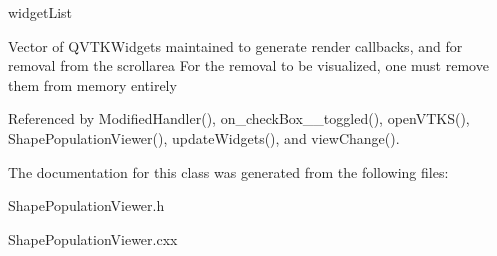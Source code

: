 widget\-List 

Vector of Q\-V\-T\-K\-Widgets maintained to generate render callbacks, and for removal from the scrollarea For the removal to be visualized, one must remove them from memory entirely 

Referenced by Modified\-Handler(), on\-\_\-check\-Box\-\_\-\_\-toggled(), open\-V\-T\-K\-S(), Shape\-Population\-Viewer(), update\-Widgets(), and view\-Change().



The documentation for this class was generated from the following files\-:\begin{DoxyCompactItemize}
\item 
Shape\-Population\-Viewer.\-h\item 
Shape\-Population\-Viewer.\-cxx\end{DoxyCompactItemize}
